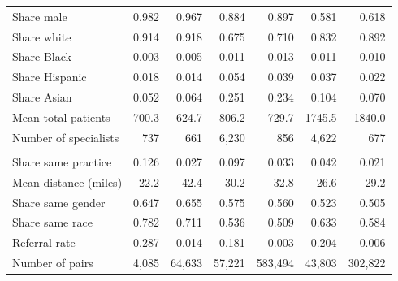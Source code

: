 \begin{tabular}{lrrrrrr}
\hspace{1em}Share male & 0.982 & 0.967 & 0.884 & 0.897 & 0.581 & 0.618\\
\hspace{1em}Share white & 0.914 & 0.918 & 0.675 & 0.710 & 0.832 & 0.892\\
\hspace{1em}Share Black & 0.003 & 0.005 & 0.011 & 0.013 & 0.011 & 0.010\\
\hspace{1em}Share Hispanic & 0.018 & 0.014 & 0.054 & 0.039 & 0.037 & 0.022\\
\hspace{1em}Share Asian & 0.052 & 0.064 & 0.251 & 0.234 & 0.104 & 0.070\\
\hspace{1em}Mean total patients & 700.3 & 624.7 & 806.2 & 729.7 & 1745.5 & 1840.0\\
\hspace{1em}Number of specialists & 737 & 661 & 6,230 & 856 & 4,622 & 677\\
\addlinespace[0.3em]
\multicolumn{7}{l}{\textbf{Panel C: Pairs}}\\
\hspace{1em}Share same practice & 0.126 & 0.027 & 0.097 & 0.033 & 0.042 & 0.021\\
\hspace{1em}Mean distance (miles) & 22.2 & 42.4 & 30.2 & 32.8 & 26.6 & 29.2\\
\hspace{1em}Share same gender & 0.647 & 0.655 & 0.575 & 0.560 & 0.523 & 0.505\\
\hspace{1em}Share same race & 0.782 & 0.711 & 0.536 & 0.509 & 0.633 & 0.584\\
\hspace{1em}Referral rate & 0.287 & 0.014 & 0.181 & 0.003 & 0.204 & 0.006\\
\hspace{1em}Number of pairs & 4,085 & 64,633 & 57,221 & 583,494 & 43,803 & 302,822\\
\bottomrule
\end{tabular}
